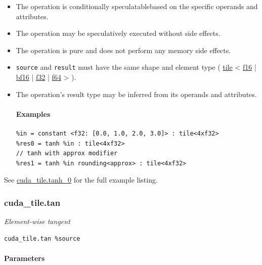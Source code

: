 \documentclass{article}
\begin{document}
\begin{itemize}
\item The operation is conditionally speculatablebased on the specific operands and attributes.
\item The operation may be speculatively executed without side effects.
\item The operation is pure and does not perform any memory side effects.
\item \texttt{source} and \texttt{result} must have the same shape and element type ( \href{https://docs.nvidia.com/cuda/tile-ir/latest/sections/types.html#type-tile}{tile} < \href{https://docs.nvidia.com/cuda/tile-ir/latest/sections/types.html#subsection-element-types}{f16} | \href{https://docs.nvidia.com/cuda/tile-ir/latest/sections/types.html#subsection-element-types}{bf16} | \href{https://docs.nvidia.com/cuda/tile-ir/latest/sections/types.html#subsection-element-types}{f32} | \href{https://docs.nvidia.com/cuda/tile-ir/latest/sections/types.html#subsection-element-types}{f64} > ).
\item The operation's result type may be inferred from its operands and attributes.


\paragraph{Examples}

\begin{lstlisting}
%in = constant <f32: [0.0, 1.0, 2.0, 3.0]> : tile<4xf32>
%res0 = tanh %in : tile<4xf32>
// tanh with approx modifier
%res1 = tanh %in rounding<approx> : tile<4xf32>
\end{lstlisting}

\end{itemize}
See \href{https://docs.nvidia.com/cuda/tile-ir/latest/sections/appendix.html#example-cuda-tile-tanh-0}{cuda\_tile.tanh\_0} for the full example listing.



\subsubsection{cuda\_tile.tan}

\textit{Element-wise tangent}


\begin{lstlisting}
cuda_tile.tan %source
\end{lstlisting}

\paragraph{Parameters}
\end{document}

